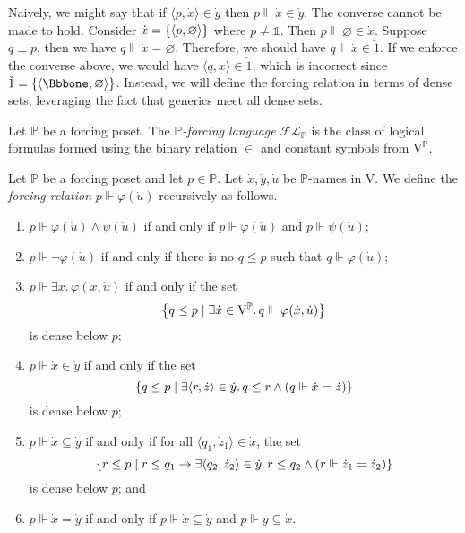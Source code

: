 Naively, we might say that if \( \langle p, \dot x \rangle \in \dot y \) then \( p \Vdash \dot x \in \dot y \).
The converse cannot be made to hold.
Consider \( \dot x = \qty{\langle p, \varnothing \rangle} \) where \( p \neq \Bbbone \).
Then \( p \Vdash \varnothing \in \dot x \).
Suppose \( q \perp p \), then we have \( q \Vdash \dot x = \varnothing \).
Therefore, we should have \( q \Vdash \dot x \in \check 1 \).
If we enforce the converse above, we would have \( \langle q, \dot x \rangle \in \check 1 \), which is incorrect since \( \check 1 = \qty{\langle \Bbbone, \varnothing \rangle} \).
Instead, we will define the forcing relation in terms of dense sets, leveraging the fact that generics meet all dense sets.
\begin{definition}
    Let \( \mathbb P \) be a forcing poset.
    The \emph{\( \mathbb P \)-forcing language} \( \mathcal{FL}_{\mathbb P} \) is the class of logical formulas formed using the binary relation \( \in \) and constant symbols from \( \mathrm{V}^{\mathbb P} \).
\end{definition}
\begin{definition}
    Let \( \mathbb P \) be a forcing poset and let \( p \in \mathbb P \).
    Let \( \dot x, \dot y, \dot u \) be \( \mathbb P \)-names in \( \mathrm{V} \).
    We define the \emph{forcing relation} \( p \Vdash \varphi(\dot u) \) recursively as follows.
    \begin{enumerate}
        \item \( p \Vdash \varphi(\dot u) \wedge \psi(\dot u) \) if and only if \( p \Vdash \varphi(\dot u) \) and \( p \Vdash \psi(\dot u) \);
        \item \( p \Vdash \neg\varphi(\dot u) \) if and only if there is no \( q \leq p \) such that \( q \Vdash \varphi(\dot u) \);
        \item \( p \Vdash \exists x.\, \varphi(x, \dot u) \) if and only if the set
        \[ \qty{q \leq p \mid \exists \dot x \in \mathrm{V}^{\mathbb P}.\, q \Vdash \varphi(\dot x, \dot u)} \]
        is dense below \( p \);
        \item \( p \Vdash \dot x \in \dot y \) if and only if the set
        \[ \qty{q \leq p \mid \exists \langle r, \dot z \rangle \in \dot y.\, q \leq r \wedge (q \Vdash \dot x = \dot z)} \]
        is dense below \( p \);
        \item \( p \Vdash \dot x \subseteq \dot y \) if and only if for all \( \langle q_1, \dot z_1 \rangle \in \dot x \), the set
        \[ \qty{r \leq p \mid r \leq q_1 \to \exists \langle q_2, \dot z_2 \rangle \in \dot y.\, r \leq q_2 \wedge (r \Vdash \dot z_1 = \dot z_2)} \]
        is dense below \( p \); and
        \item \( p \Vdash \dot x = \dot y \) if and only if \( p \Vdash \dot x \subseteq \dot y \) and \( p \Vdash \dot y \subseteq \dot x \).
    \end{enumerate}
\end{definition}
